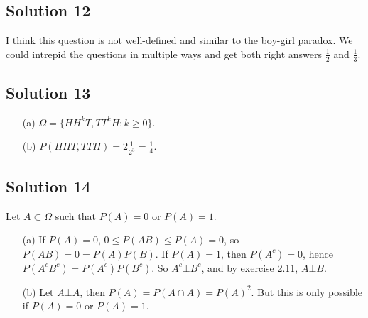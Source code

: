 \subsection*{Solution 12}

I think this question is not well-defined and similar to the boy-girl paradox.
We could intrepid the questions in multiple ways and get both right answers $\frac{1}{2}$ and $\frac{1}{3}$.


\subsection*{Solution 13}

\begin{itemize}
    \item[(a)] $\Omega = \{ HH^kT, TT^kH: k \geq 0 \}$.
    \item[(b)] $P(HHT, TTH) = 2 \frac{1}{2^3} = \frac{1}{4}$.
\end{itemize}


\subsection*{Solution 14}

Let $A \subset \Omega$ such that $P(A) = 0$ or $P(A) = 1$.
\begin{itemize}
    \item[(a)] If $P(A) = 0$, $0 \leq P(AB) \leq P(A) = 0$, so $P(AB) = 0 = P(A)P(B)$.
        If $P(A) = 1$, then $P(A^c) = 0$, hence $P(A^c B^c) = P(A^c) P(B^c)$.
        So $A^c \bot B^c$, and by exercise 2.11, $A \bot B$.
    \item[(b)] Let $A \bot A$, then $P(A) = P(A \cap A) = P(A)^2$.
        But this is only possible if $P(A) = 0$ or $P(A) = 1$.
\end{itemize}
